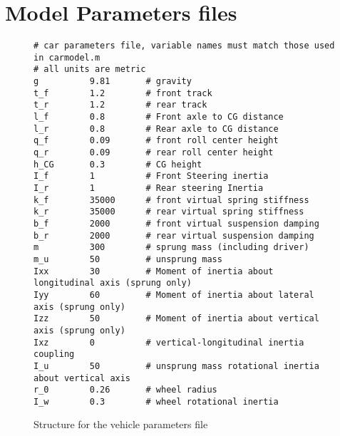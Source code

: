\chapter{Model Parameters files}
\label{chap:params}

\begin{figure}[ht]
\begin{Verbatim}
# car parameters file, variable names must match those used in carmodel.m
# all units are metric
g          9.81       # gravity
t_f        1.2        # front track
t_r        1.2        # rear track
l_f        0.8        # Front axle to CG distance
l_r        0.8        # Rear axle to CG distance
q_f        0.09       # front roll center height
q_r        0.09       # rear roll center height
h_CG       0.3        # CG height
I_f        1          # Front Steering inertia
I_r        1          # Rear steering Inertia
k_f        35000      # front virtual spring stiffness
k_r        35000      # rear virtual spring stiffness
b_f        2000       # front virtual suspension damping
b_r        2000       # rear virtual suspension damping
m          300        # sprung mass (including driver)
m_u        50         # unsprung mass
Ixx        30         # Moment of inertia about longitudinal axis (sprung only)
Iyy        60         # Moment of inertia about lateral axis (sprung only)
Izz        50         # Moment of inertia about vertical axis (sprung only)
Ixz        0          # vertical-longitudinal inertia coupling
I_u        50         # unsprung mass rotational inertia about vertical axis
r_0        0.26       # wheel radius
I_w        0.3        # wheel rotational inertia
\end{Verbatim}
\caption{Structure for the vehicle parameters file}
\label{params}
\end{figure}

